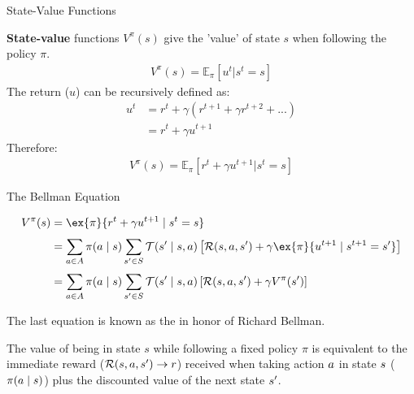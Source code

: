 \begin{frame}{State-Value Functions}

    \textbf{State-value} functions $V^{\pi}(s)$ give the 'value' of state $s$ when following the policy $\pi$. 
    \vspace{0pt}
    \begin{align*}
    V^{\pi}(s) = \mathbb{E}_\pi \left[u^{t} | s^{t} = s \right]
    \end{align*}
    \vspace{0pt}
    The return ($u$) can be recursively defined as:
    \vspace{0pt}
    \begin{align*}
            u^t &= r^t +\gamma (r^{t+1} + \gamma r^{t+2} + ... )  \\ &= r^t + \gamma u^{t+1}
    \end{align*}
    \vspace{0pt}   
    Therefore:
    \vspace{0pt}
    \begin{align*}
        V^{\pi}(s) = \mathbb{E}_\pi \left[r^t + \gamma u^{t+1}| s^{t} = s \right]
    \end{align*}
    \vspace{5pt}
\end{frame}

\begin{frame}[t]{The Bellman Equation}

    \begin{align*}
        V^{\pi}(\st) &= \ex{\pi}{\rew^t + \gamma u^{t+1} \mid \st^{t} = \st } \\[3pt]
                   &= \sum_{\ac \in \Ac} \pi(\ac \mid \st) \sum_{\st' \in \St} \Stf(\st'\mid \st, \ac) \left[\Rew(\st, \ac, \st') + \gamma \ex{\pi}{u^{t+1} \mid \st^{t+1} = \st'}\right] \\[3pt]
                   &= \sum_{\ac \in \Ac} \pi(\ac \mid \st) \sum_{\st' \in \St} \Stf(\st'\mid \st, \ac) \left[\Rew(\st, \ac, \st') + \gamma V^{\pi}(\st')\right]
    \end{align*}
    
    The last equation is known as the  in honor of Richard Bellman. 
    
    \blist
        \item The value of being in state $s$ while following a fixed policy $\pi$ is equivalent to the immediate reward ($\mathcal{R}(s, a, s') \to r$) received when taking action $a$ in state $s$ ($\pi(a \mid s)$) plus the discounted value of the next state $s'$. 
    \elist
\end{frame}

